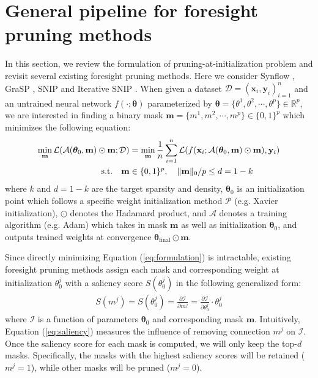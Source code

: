 \documentclass{article} %
\begin{document}
\section{General pipeline for foresight pruning methods} \label{sect:pruning-pipeline}
In this section, we review the formulation of pruning-at-initialization problem and revisit several existing foresight pruning methods. Here we consider Synflow \citep{synflow}, GraSP \citep{grasp}, SNIP \citep{snip} and Iterative SNIP \citep{force}. When given a dataset $\mathcal{D}={(\mathbf{x}_i,\mathbf{y}_i)}_{i=1}^{n}$ and an untrained neural network $f(\cdot;\boldsymbol{\theta})$ parameterized by $\boldsymbol{\theta}=\{\theta^1, \theta^2, \cdots, \theta^p\} \in \mathbb{R}^{p}$, we are interested in finding a binary mask $\mathbf{m}=\{m^1,m^2,\cdots,m^p\} \in \{0,1\}^{p}$ which minimizes the following equation:
\begin{align}
    \min_{\mathbf{m}}\mathcal{L}(\mathcal{A}(\boldsymbol{\theta}_0,\mathbf{m}) \odot \mathbf{m}; \mathcal{D}) &= \min_{\mathbf{m}}\frac{1}{n}\sum_{i=1}^{n}\mathcal{L}(f(\mathbf{x}_i;{\mathcal{A}(\boldsymbol{\theta}_0,\mathbf{m}) \odot \mathbf{m}}),\mathbf{y}_i) \label{eq:formulation}\\ 
    \textrm{s.t.} \quad \mathbf{m} &\in \{0,1\}^{p}, \quad \|\mathbf{m}\|_0 /p \leq d = 1-k\nonumber
\end{align}
where $k$ and $d=1-k$ are the target sparsity and density, $\boldsymbol{\theta}_0 $ is an initialization point which follows a specific weight initialization method $\mathcal{P}$ (e.g. Xavier initialization), $\odot$ denotes the Hadamard product, and $\mathcal{A}$ denotes a training algorithm (e.g. Adam) which takes in mask $\mathbf{m}$ as well as initialization $\boldsymbol{\theta}_0$, and outputs trained weights at convergence $\boldsymbol{\theta}_\text{final} \odot \mathbf{m}$.

Since directly minimizing Equation (\ref{eq:formulation}) is intractable, existing foresight pruning methods assign each mask and corresponding weight at initialization $\theta_0^j$ with a saliency score $S(\theta_0^j)$ in the following generalized form:
\begin{align}
    S(m^j)=S(\theta_0^j)= \frac{\partial \mathcal{I}}{\partial m^j} = \frac{\partial \mathcal{I}}{\partial \theta_0^j} \cdot \theta_0^j \label{eq:saliency}
\end{align}
where $\mathcal{I}$ is a function of parameters $\boldsymbol{\theta}_0$ and corresponding mask $\mathbf{m}$. Intuitively, Equation (\ref{eq:saliency}) measures the influence of removing connection $m^j$ on $\mathcal{I}$. Once the saliency score for each mask is computed, we will only keep the top-$d$ masks. Specifically, the masks with the highest saliency scores will be retained ($m^j=1$), while other masks will be pruned ($m^{j}=0$). 
\end{document}
